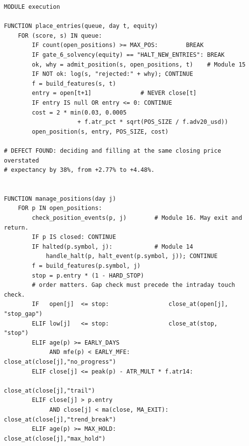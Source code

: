 \documentclass[10pt]{article}
\begin{document}
\begin{lstlisting}
MODULE execution

FUNCTION place_entries(queue, day t, equity)
    FOR (score, s) IN queue:
        IF count(open_positions) >= MAX_POS:        BREAK
        IF gate_6_solvency(equity) == "HALT_NEW_ENTRIES": BREAK
        ok, why = admit_position(s, open_positions, t)    # Module 15
        IF NOT ok: log(s, "rejected:" + why); CONTINUE
        f = build_features(s, t)
        entry = open[t+1]              # NEVER close[t]
        IF entry IS null OR entry <= 0: CONTINUE
        cost = 2 * min(0.03, 0.0005
                     + f.atr_pct * sqrt(POS_SIZE / f.adv20_usd))
        open_position(s, entry, POS_SIZE, cost)

# DEFECT FOUND: deciding and filling at the same closing price overstated
# expectancy by 38%, from +2.77% to +4.48%.


FUNCTION manage_positions(day j)
    FOR p IN open_positions:
        check_position_events(p, j)        # Module 16. May exit and return.
        IF p IS closed: CONTINUE
        IF halted(p.symbol, j):            # Module 14
            handle_halt(p, halt_event(p.symbol, j)); CONTINUE
        f = build_features(p.symbol, j)
        stop = p.entry * (1 - HARD_STOP)
        # order matters. Gap check must precede the intraday touch check.
        IF   open[j]  <= stop:                 close_at(open[j], "stop_gap")
        ELIF low[j]   <= stop:                 close_at(stop,    "stop")
        ELIF age(p) >= EARLY_DAYS
             AND mfe(p) < EARLY_MFE:           close_at(close[j],"no_progress")
        ELIF close[j] <= peak(p) - ATR_MULT * f.atr14:
                                               close_at(close[j],"trail")
        ELIF close[j] > p.entry
             AND close[j] < ma(close, MA_EXIT): close_at(close[j],"trend_break")
        ELIF age(p) >= MAX_HOLD:               close_at(close[j],"max_hold")


\end{lstlisting}
\end{document}
